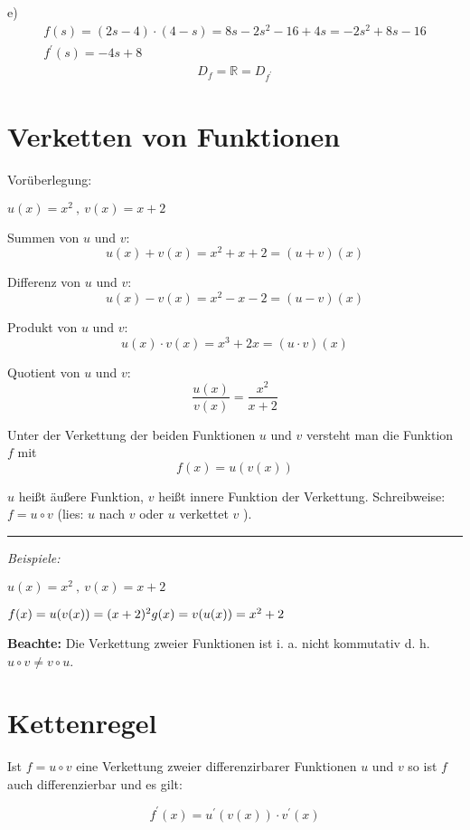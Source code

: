 e)
\begin{equation*}
    \begin{gathered}
        f(s)  = (2s-4)\cdot(4-s) = 8s-2s^2-16+4s = -2s^2 + 8s -16\\
        f^{\prime}(s)  = -4s +8 
    \end{gathered}
\end{equation*}
\begin{align*}
    D_f = \mathbb{R} = D_{f^{\prime}}
\end{align*}

\section{Verketten von Funktionen}
Vorüberlegung:

$u(x)= x^2 \ , \ v(x) = x + 2$

Summen von $u$ und $v$:
$$u(x)+v(x) = x^2 +x+2 = (u + v)(x)$$

Differenz von $u$ und $v$:
$$u(x)-v(x)=x^2-x-2 = (u-v)(x)$$

Produkt von $u$ und $v$:
$$u(x) \cdot v(x) = x^3+ 2x = (u \cdot v)(x)$$

Quotient von $u$ und $v$:
$$\frac{u(x)}{v(x)} = \frac{x^2}{x+2}$$

\begin{definition}
Unter der Verkettung der beiden Funktionen $u$ und $v$ versteht man die Funktion $f$ mit
$$f(x)=u(v(x))$$
\end{definition}

$u$ heißt äußere Funktion, $v$ heißt innere Funktion der Verkettung. Schreibweise: $f = u \circ v$ (lies: \glqq $u$ nach $v$\grqq{} oder  \glqq $u$ verkettet $v$\grqq{} ).

\noindent\rule{\textwidth}{1pt}

\textit{Beispiele:}

$u(x) = x^2 \ , \ v(x) = x + 2$

$f(x) = u(v(x)) = (x+2)^2 \\ g(x) = v(u(x)) = x^2 + 2$

\textbf{Beachte:} Die Verkettung zweier Funktionen ist i. a. nicht kommutativ d. h. $u \circ v \neq v \circ u$.

\section{Kettenregel}

\begin{satz}
    Ist $f = u \circ v$ eine Verkettung zweier differenzirbarer Funktionen $u$ und $v$ so ist $f$ auch differenzierbar und es gilt:

$$f^{\prime}(x) = u^{\prime}(v(x)) \cdot v^{\prime}(x)$$
\end{satz}

